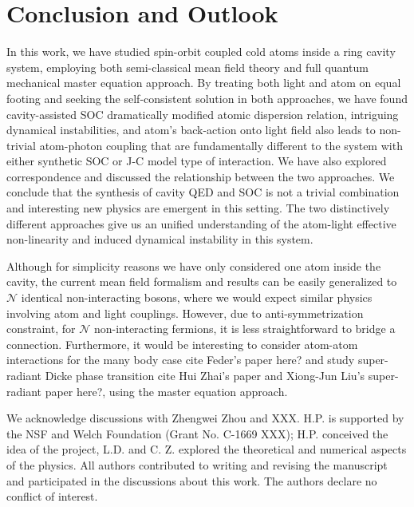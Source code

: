 \documentclass[atoms,article,submit,moreauthors,pdftex,12pt,a4paper]{mdpi}
\begin{document}
\section{Conclusion and Outlook} \label{conclusion}

In this work, we have studied spin-orbit coupled cold atoms inside a ring cavity system, employing both semi-classical mean field theory and full quantum mechanical master equation approach. By treating both light and atom on equal footing and seeking the self-consistent solution in both approaches, we have found cavity-assisted SOC dramatically modified atomic dispersion relation, intriguing dynamical instabilities, and atom's back-action onto light field also leads to non-trivial atom-photon coupling that are fundamentally different to the system with either synthetic SOC or J-C model type of interaction. We have also explored correspondence and discussed the relationship between the two approaches. We conclude that the synthesis of cavity QED and SOC is not a trivial combination and interesting new physics are emergent in this setting. The two distinctively different approaches give us an unified understanding of the atom-light effective non-linearity and induced dynamical instability in this system. 

Although for simplicity reasons we have only considered one atom inside the cavity, the current mean field formalism and results can be easily generalized to $\mathcal{N}$ identical non-interacting bosons, where we would expect similar physics involving atom and light couplings. However, due to anti-symmetrization constraint, for $\mathcal{N}$ non-interacting fermions, it is less straightforward to bridge a connection. Furthermore, it would be interesting to consider atom-atom interactions for the many body case {\color{red} cite Feder's paper here?} and study super-radiant Dicke phase transition {\color{red} cite Hui Zhai's paper and Xiong-Jun Liu's super-radiant paper here?}, using the master equation approach. 

We acknowledge discussions with Zhengwei Zhou and XXX. H.P. is supported by the NSF and Welch Foundation (Grant No. C-1669 XXX);
H.P. conceived the idea of the project, L.D. and C. Z. explored the theoretical and numerical aspects of the physics. All authors contributed to writing and revising the manuscript and participated in the discussions about this work.
The authors declare no conflict of interest. 
\end{document}
